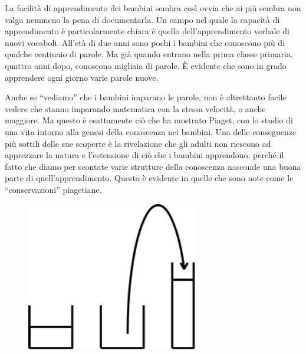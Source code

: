 La facilità di apprendimento dei bambini sembra così ovvia che ai più sembra non valga nemmeno la pena di documentarla. Un campo nel quale la capacità di apprendimento è particolarmente chiara è quello dell'apprendimento verbale di nuovi vocaboli. All'età di due anni sono pochi i bambini che conoscono più di qualche centinaio di parole. Ma già quando entrano nella prima classe primaria, quattro anni dopo, conoscono migliaia di parole. È evidente che sono in grado apprendere ogni giorno varie parole nuove. 

Anche se “vediamo” che i bambini imparano le parole, non è altrettanto facile vedere che stanno imparando matematica con la stessa velocità, o anche maggiore. Ma questo è esattamente ciò che ha mostrato Piaget, con lo studio di una vita intorno alla genesi della conoscenza nei bambini. Una delle conseguenze più sottili delle sue scoperte è la rivelazione che gli adulti non riescono ad apprezzare la natura e l'estensione di ciò che i bambini apprendono, perché il fatto che diamo per scontate varie strutture della conoscenza nasconde una buona parte di quell'apprendimento. Questo è evidente in quelle che sono note come le “conservazioni” piagetiane.

\begin{figure}
   \centering
   \includegraphics[width=7.5cm]{./images/papert-1/220px-Fig-2-mindstorms.png}
   \label{Papert}
\end{figure}

